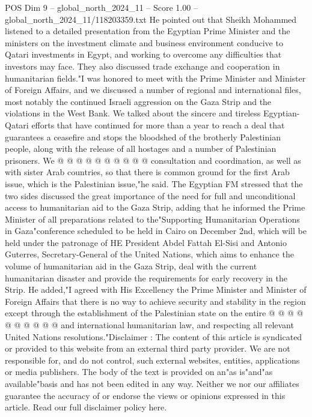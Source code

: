 \begin{textsample}{POS Dim 9 – global\_north\_2024\_11 – Score 1.00 – global\_north\_2024\_11/118203359.txt}
He pointed out that Sheikh Mohammed listened to a detailed presentation from the Egyptian Prime Minister and the ministers on the investment climate and business environment conducive to Qatari investments in Egypt, and working to overcome any difficulties that investors may face.
They also discussed trade exchange and cooperation in humanitarian fields."I was honored to meet with the Prime Minister and Minister of Foreign Affairs, and we discussed a number of regional and international files, most notably the continued Israeli aggression on the Gaza Strip and the violations in the West Bank.
We talked about the sincere and tireless Egyptian-Qatari efforts that have continued for more than a year to reach a deal that guarantees a ceasefire and stops the bloodshed of the brotherly Palestinian people, along with the release of all hostages and a number of Palestinian prisoners.
We @ @ @ @ @ @ @ @ @ @ consultation and coordination, as well as with sister Arab countries, so that there is common ground for the first Arab issue, which is the Palestinian issue,"he said.
The Egyptian FM stressed that the two sides discussed the great importance of the need for full and unconditional access to humanitarian aid to the Gaza Strip, adding that he informed the Prime Minister of all preparations related to the"Supporting Humanitarian Operations in Gaza"conference scheduled to be held in Cairo on December 2nd, which will be held under the patronage of HE President Abdel Fattah El-Sisi and Antonio Guterres, Secretary-General of the United Nations, which aims to enhance the volume of humanitarian aid in the Gaza Strip, deal with the current humanitarian disaster and provide the requirements for early recovery in the Strip.
He added,"I agreed with His Excellency the Prime Minister and Minister of Foreign Affairs that there is no way to achieve security and stability in the region except through the establishment of the Palestinian state on the entire @ @ @ @ @ @ @ @ @ @ and international humanitarian law, and respecting all relevant United Nations resolutions."Disclaimer : The content of this article is syndicated or provided to this website from an external third party provider.
We are not responsible for, and do not control, such external websites, entities, applications or media publishers.
The body of the text is provided on an"as is"and"as available"basis and has not been edited in any way.
Neither we nor our affiliates guarantee the accuracy of or endorse the views or opinions expressed in this article.
Read our full disclaimer policy here.

\end{textsample}
